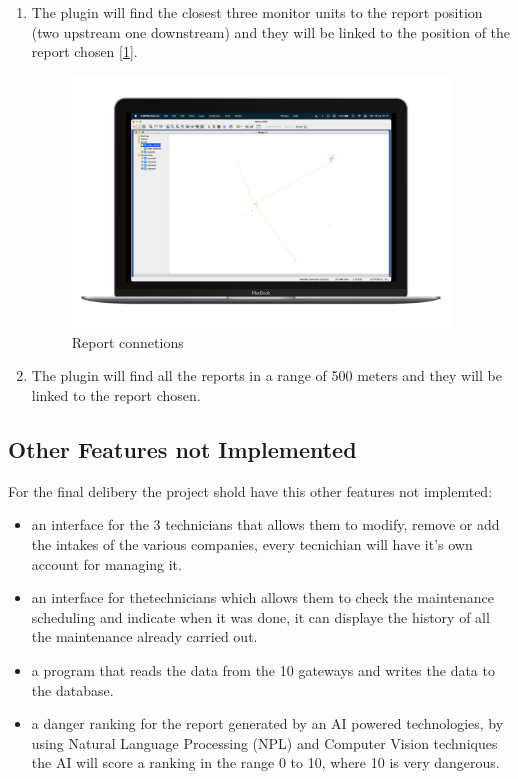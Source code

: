 \begin{enumerate}
    \item The plugin will find the closest three monitor units to the report position (two upstream one downstream) and they will be linked to the position of the report chosen [\ref{optuTorial3}].
    \begin{figure}[H]
        \centering
        \includegraphics[width=27em]{img/op3.png} \caption{Report connetions} \label{optuTorial3}
    \end{figure}

    \item The plugin will find all the reports in a range of 500 meters and they will be linked to the report chosen.
\end{enumerate}



\subsection{Other Features not Implemented}

For the final delibery the project shold have this other features not implemted:

\begin{itemize}
    \item an interface for the 3 technicians that allows them to modify, remove or add the intakes of the various companies, every tecnichian will have it's own account for managing it.
    \item an interface for thetechnicians which allows them to check the maintenance scheduling and indicate when it was done, it can displaye the history of all the maintenance already carried out.
    \item a program that reads the data from the 10 gateways and writes the data to the database.
    \item a danger ranking for the report generated by an AI powered technologies, by using Natural Language Processing (NPL) and Computer Vision techniques the AI will score a ranking in the range 0 to 10, where 10 is very dangerous.
\end{itemize}

